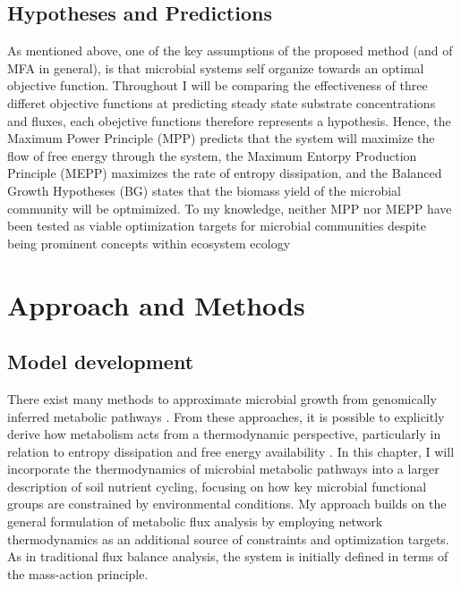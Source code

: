 \subsection{Hypotheses and Predictions}

As mentioned above, one of the key assumptions of the proposed method (and of MFA in general), is that microbial systems self organize towards an optimal objective function. Throughout I will be comparing the effectiveness of three differet objective functions at predicting steady state substrate concentrations and fluxes, each obejctive functions therefore represents a hypothesis. Hence, the Maximum Power Principle (MPP) predicts that the system will maximize the flow of free energy through the system, the Maximum Entorpy Production Principle (MEPP) maximizes the rate of entropy dissipation, and the Balanced Growth Hypotheses (BG) states that the biomass yield of the microbial community will be optmimized. To my knowledge, neither MPP nor MEPP have been tested as viable optimization targets for microbial communities despite being prominent concepts within ecosystem ecology \cite{odum_times_1955,meysman_thermodynamic_2007, unrean_metabolic_2011, endres_entropy_2017}

\section{Approach and Methods}

\subsection{Model development}

There exist many methods to approximate microbial growth from genomically inferred metabolic pathways \cite{kreft_genes_2017}. From these approaches, it is possible to explicitly derive how metabolism acts from a thermodynamic perspective, particularly in relation to entropy dissipation and free energy availability \cite{kleerebezem2010a}. In this chapter, I will incorporate the thermodynamics of microbial metabolic pathways into a larger description of soil nutrient cycling, focusing on how key microbial functional groups are constrained by environmental conditions. My approach builds on the general formulation of metabolic flux analysis by employing network thermodynamics as an additional source of constraints and optimization targets. As in traditional flux balance analysis, the system is initially defined in terms of the mass-action principle.

